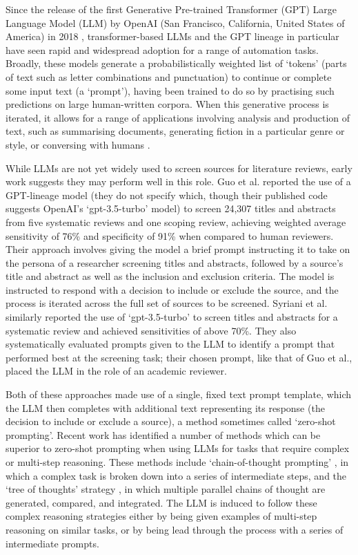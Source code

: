 \documentclass[10pt,a4paper,twocolumn]{article}
\begin{document}
Since the release of the first Generative Pre-trained Transformer (GPT) Large Language Model (LLM) by OpenAI (San Francisco, California, United States of America) in 2018 \cite{Radford.2018}, transformer-based LLMs and the GPT lineage in particular have seen rapid and widespread adoption for a range of automation tasks. Broadly, these models generate a probabilistically weighted list of `tokens' (parts of text such as letter combinations and punctuation) to continue or complete some input text (a `prompt'), having been trained to do so by practising such predictions on large human-written corpora. When this generative process is iterated, it allows for a range of applications involving analysis and production of text, such as summarising documents, generating fiction in a particular genre or style, or conversing with humans \cite{OpenAI.2023}.

While LLMs are not yet widely used to screen sources for literature reviews, early work suggests they may perform well in this role. Guo et al. \cite{Guo.2023} reported the use of a GPT-lineage model (they do not specify which, though their published code suggests OpenAI's `gpt-3.5-turbo' model) to screen 24,307 titles and abstracts from five systematic reviews and one scoping review, achieving weighted average sensitivity of 76\% and specificity of 91\% when compared to human reviewers. Their approach involves giving the model a brief prompt instructing it to take on the persona of a researcher screening titles and abstracts, followed by a source's title and abstract as well as the inclusion and exclusion criteria. The model is instructed to respond with a decision to include or exclude the source, and the process is iterated across the full set of sources to be screened. Syriani et al. \cite{Syriani.2023} similarly reported the use of `gpt-3.5-turbo' to screen titles and abstracts for a systematic review and achieved sensitivities of above 70\%. They also systematically evaluated prompts given to the LLM to identify a prompt that performed best at the screening task; their chosen prompt, like that of Guo et al., placed the LLM in the role of an academic reviewer.

Both of these approaches made use of a single, fixed text prompt template, which the LLM then completes with additional text representing its response (the decision to include or exclude a source), a method sometimes called `zero-shot prompting'. Recent work has identified a number of methods which can be superior to zero-shot prompting when using LLMs for tasks that require complex or multi-step reasoning. These methods include `chain-of-thought prompting' \cite{Wei.2022}, in which a complex task is broken down into a series of intermediate steps, and the `tree of thoughts' strategy \cite{Yao.2023}, in which multiple parallel chains of thought are generated, compared, and integrated. The LLM is induced to follow these complex reasoning strategies either by being given examples of multi-step reasoning on similar tasks, or by being lead through the process with a series of intermediate prompts.
\end{document}
